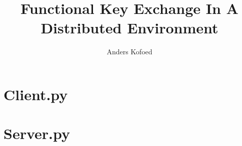 \documentclass{MScthesisITEM}
\title{Functional Key Exchange In A Distributed Environment}
\author{Anders Kofoed}
\begin{document}
\pagestyle{plain}

\titleITEM
{}





\tableofcontents*

\listoffigures



\printglossaries %
\glsaddall

\pagestyle{ruled}





\renewcommand*{\bibname}{References}


\nocite{*}

 \appendix
 \renewcommand{\chaptername}{\appendixname}
 \chapter{Client.py}\label{clientcode}


\chapter{Server.py}\label{servercode}

\end{document}
